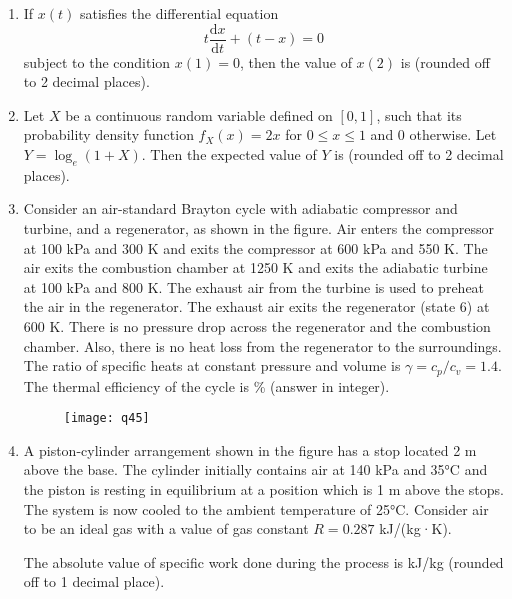 \documentclass[journal,11pt,onecolumn]{IEEEtran}
\begin{document}
\begin{enumerate}[resume]
    \item If $x(t)$ satisfies the differential equation
    \[
    t\frac{\mathrm{d}x}{\mathrm{d}t} + (t-x)=0
    \] subject to the condition $x(1) = 0$, then the value of $x(2)$ is \underline{\hspace{2cm}} (rounded off to 2 decimal places).

    \item Let $X$ be a continuous random variable defined on $[0, 1]$, such that its probability density function $f_X(x) = 2x$ for $0 \leq x \leq 1$ and 0 otherwise. Let $Y = \log_e(1 + X)$. Then the expected value of $Y$ is \underline{\hspace{2cm}} (rounded off to 2 decimal places).

    \item Consider an air-standard Brayton cycle with adiabatic compressor and turbine, and a regenerator, as shown in the figure. Air enters the compressor at 100 kPa and 300 K and exits the compressor at 600 kPa and 550 K. The air exits the combustion chamber at 1250 K and exits the adiabatic turbine at 100 kPa and 800 K. The exhaust air from the turbine is used to preheat the air in the regenerator. The exhaust air exits the regenerator (state 6) at 600 K. There is no pressure drop across the regenerator and the combustion chamber. Also, there is no heat loss from the regenerator to the surroundings. The ratio of specific heats at constant pressure and volume is $\gamma = c_p/c_v = 1.4$. The thermal efficiency of the cycle is \underline{\hspace{2cm}} \% (answer in integer).

          \begin{figure}[H]
              \centering
              \texttt{[image: q45]}
              \caption{}
              \label{fig:q45}
          \end{figure}

    \item A piston-cylinder arrangement shown in the figure has a stop located 2 m above the base. The cylinder initially contains air at 140 kPa and 35°C and the piston is resting in equilibrium at a position which is 1 m above the stops. The system is now cooled to the ambient temperature of 25°C. Consider air to be an ideal gas with a value of gas constant $R = 0.287$ kJ/(kg·K).

          The absolute value of specific work done during the process is \underline{\hspace{2cm}} kJ/kg (rounded off to 1 decimal place).


\end{enumerate}
\end{document}
